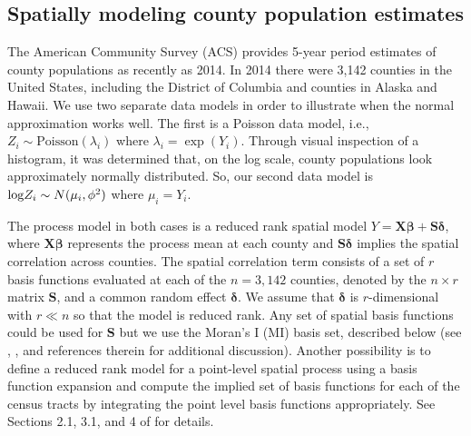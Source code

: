 \documentclass[12pt]{article}
\def\log{\hbox{log}}
\begin{document}
\subsection{Spatially modeling county population estimates}\label{sec:pop}
The American Community Survey (ACS) provides 5-year period estimates of county populations as recently as 2014. In 2014 there were 3,142 counties in the United States, including the District of Columbia and counties in Alaska and Hawaii. We use two separate data models in order to illustrate when the normal approximation works well. The first is a Poisson data model, i.e., $Z_i \sim \mathrm{Poisson}(\lambda_i)$ where $\lambda_i = \exp(Y_i)$. Through visual inspection of a histogram, it was determined that, on the log scale, county populations look approximately normally distributed. So, our second data model is $\log Z_i \sim N(\mu_i, \phi^2)$ where $\mu_i = Y_i$. 

The process model in both cases is a reduced rank spatial model $Y = \bm{X}\bm{\beta} + \bm{S}\bm{\delta}$, where $\bm{X}\bm{\beta}$ represents the process mean at each county and $\bm{S}\bm{\delta}$ implies the spatial correlation across counties. The spatial correlation term consists of a set of $r$ basis functions evaluated at each of the $n=3,142$ counties, denoted by the $n\times r$ matrix $\bm{S}$, and a common random effect $\bm{\delta}$. We assume that $\bm{\delta}$ is $r$-dimensional with $r \ll n$ so that the model is reduced rank. Any set of spatial basis functions could be used for $\bm{S}$ but we use the Moran's I (MI) basis set, described below (see \citet{hughes2013dimension}, \citet{porter2015bayesian}, \citet{bradley2015multivariate} and references therein for additional discussion). Another possibility is to define a reduced rank model for a point-level spatial process using a basis function expansion and compute the implied set of basis functions for each of the census tracts by integrating the point level basis functions appropriately. See Sections 2.1, 3.1, and 4 of \citet{bradley2016regionalization} for details.
\end{document}
